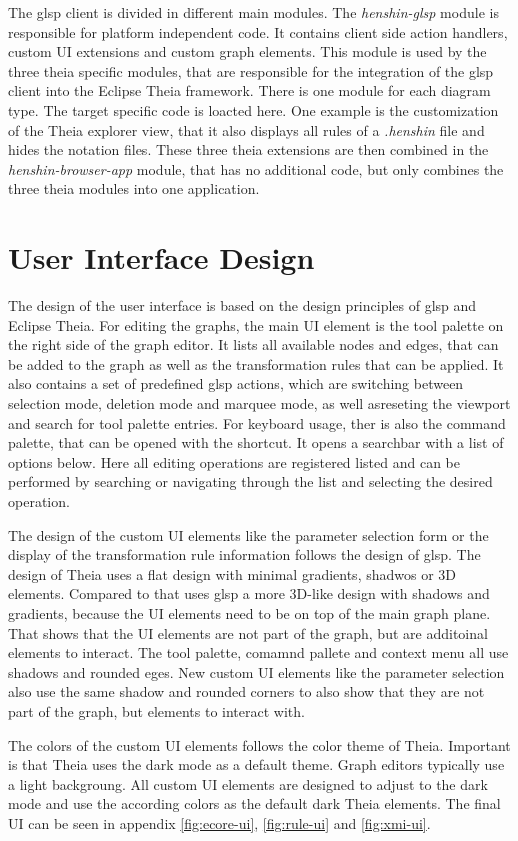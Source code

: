  The \ac{glsp} client is divided in different main modules.
  The \textit{henshin-glsp} module is responsible for platform independent code. It contains client side action handlers, custom UI extensions and custom graph elements. This module is used by the three theia specific modules, that are responsible for the integration of the \ac{glsp} client into the Eclipse Theia framework. There is one module for each diagram type. The target specific code is loacted here. One example is the customization of the Theia explorer view, that it also displays all rules of a \textit{.henshin} file and hides the notation files. These three theia extensions are then combined in the \textit{henshin-browser-app} module, that has no additional code, but only combines the three theia modules into one application. 

 \section{User Interface Design}
  \label{subsec:user-interface-design}

  The design of the user interface is based on the design principles of \ac{glsp} and Eclipse Theia. For editing the graphs, the main UI element is the tool palette on the right side of the graph editor. It lists all available nodes and edges, that can be added to the graph as well as the transformation rules that can be applied. It also contains a set of predefined \ac{glsp} actions, which are switching between selection mode, deletion mode and marquee mode, as well asreseting the viewport and search for tool palette entries. For keyboard usage, ther is also the command palette, that can be opened with the  shortcut. It opens a searchbar with a list of options below. Here all editing operations are registered listed and can be performed by searching or navigating through the list and selecting the desired operation. 
  
  The design of the custom UI elements like the parameter selection form or the display of the transformation rule information follows the design of \ac{glsp}. The design of Theia uses a flat design with minimal gradients, shadwos or 3D elements. Compared to that uses \ac{glsp} a more 3D-like design with shadows and gradients, because the UI elements need to be on top of the main graph plane. That shows that the UI elements are not part of the graph, but are additoinal elements to interact. The tool palette, comamnd pallete and context menu all use shadows and rounded eges. New custom UI elements like the parameter selection also use the same shadow and rounded corners to also show that they are not part of the graph, but elements to interact with.

  The colors of the custom UI elements follows the color theme of Theia. Important is that Theia uses the dark mode as a default theme. Graph editors typically use a light backgroung. All custom UI elements are designed to adjust to the dark mode and use the according colors as the default dark Theia elements. The final UI can be seen in appendix \ref{fig:ecore-ui}, \ref{fig:rule-ui} and \ref{fig:xmi-ui}.

